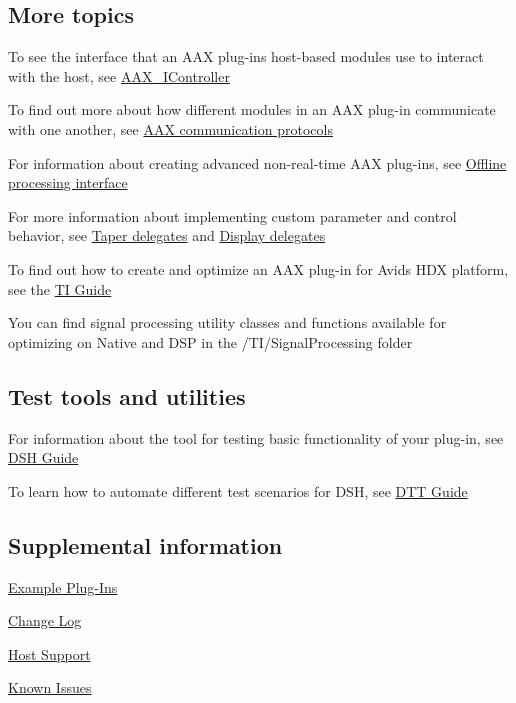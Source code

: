 \hypertarget{a00323_welcome_more}{}\subsection{More topics}\label{a00323_welcome_more}
\begin{DoxyItemize}
\item To see the interface that an A\+A\+X plug-\/in\textquotesingle{}s host-\/based modules use to interact with the host, see \hyperlink{a00090}{A\+A\+X\+\_\+\+I\+Controller} \item To find out more about how different modules in an A\+A\+X plug-\/in communicate with one another, see \hyperlink{a00330}{A\+A\+X communication protocols} \item For information about creating advanced non-\/real-\/time A\+A\+X plug-\/ins, see \hyperlink{a00334}{Offline processing interface} \item For more information about implementing custom parameter and control behavior, see \hyperlink{a00345}{Taper delegates} and \hyperlink{a00346}{Display delegates} \item To find out how to create and optimize an A\+A\+X plug-\/in for Avid\textquotesingle{}s H\+D\+X platform, see the \hyperlink{a00362}{T\+I Guide} \item You can find signal processing utility classes and functions available for optimizing on Native and D\+S\+P in the /\+T\+I/\+Signal\+Processing folder\end{DoxyItemize}
\hypertarget{a00323_welcome_testtools}{}\subsection{Test tools and utilities}\label{a00323_welcome_testtools}
\begin{DoxyItemize}
\item For information about the tool for testing basic functionality of your plug-\/in, see \hyperlink{a00365}{D\+S\+H Guide} \item To learn how to automate different test scenarios for D\+S\+H, see \hyperlink{a00366}{D\+T\+T Guide}\end{DoxyItemize}
\hypertarget{a00323_welcome_supplemental}{}\subsection{Supplemental information}\label{a00323_welcome_supplemental}
\begin{DoxyItemize}
\item \hyperlink{a00376}{Example Plug-\/\+Ins} \item \hyperlink{a00375}{Change Log} \item \hyperlink{a00373}{Host Support} \item \hyperlink{a00374}{Known Issues}\end{DoxyItemize}
